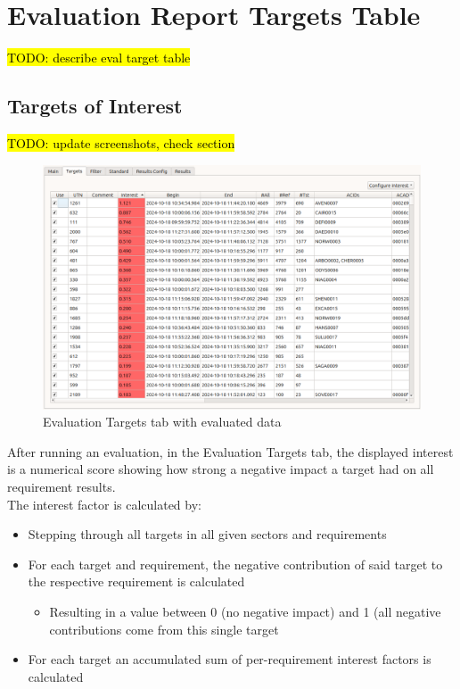
\section{Evaluation Report Targets Table}
\label{sec:eval_report_targets}

\hl{TODO: describe eval target table}

\subsection{Targets of Interest}
\label{sec:eval_targets_of_interest}

\hl{TODO: update screenshots, check section}

\begin{figure}[H]
  \hspace*{-2cm}
    \includegraphics[width=18cm,frame]{figures/eval_targets_eval.png}
  \caption{Evaluation Targets tab with evaluated data}
\end{figure}

After running an evaluation, in the Evaluation Targets tab, the displayed interest is a numerical score showing how strong a negative impact a target had on all requirement results. \\

The interest factor is calculated by:
\begin{itemize}  
\item Stepping through all targets in all given sectors and requirements
\item For each target and requirement, the negative contribution of said target to the respective requirement is calculated
\begin{itemize}  
\item Resulting in a value between 0 (no negative impact) and 1 (all negative contributions come from this single target
\end{itemize}
\item For each target an accumulated sum of per-requirement interest factors is calculated
\end{itemize}
\ \\

